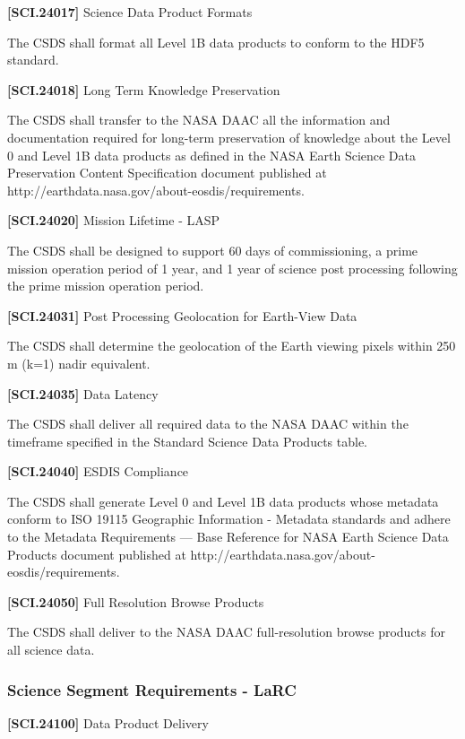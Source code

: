 \documentclass[12pt,oneside,oldfontcommands]{memoir}
\begin{document}
\textbf{[SCI.24017]} Science Data Product Formats

The \gls{CSDS} shall format all Level 1B data products to conform to the HDF5 standard.

\textbf{[SCI.24018]} Long Term Knowledge Preservation

The \gls{CSDS} shall transfer to the NASA \gls{DAAC} all the information and documentation required for long-term preservation of knowledge about the Level 0 and Level 1B data products as defined in the NASA Earth Science Data Preservation Content Specification document published at http:\slash \slash earthdata.nasa.gov\slash about-eosdis\slash requirements.

\textbf{[SCI.24020]} Mission Lifetime - \gls{LASP}

The \gls{CSDS} shall be designed to support 60 days of commissioning, a prime mission operation period of 1 year, and 1 year of science post processing following the prime mission operation period.

\textbf{[SCI.24031]} Post Processing Geolocation for Earth-View Data

The \gls{CSDS} shall determine the geolocation of the Earth viewing pixels within 250 m (k=1) nadir equivalent.

\textbf{[SCI.24035]} Data Latency

The \gls{CSDS} shall deliver all required data to the NASA \gls{DAAC} within the timeframe specified in the Standard Science Data Products table.

\textbf{[SCI.24040]} \gls{ESDIS} Compliance

The \gls{CSDS} shall generate Level 0 and Level 1B data products whose metadata conform to ISO 19115 Geographic Information - Metadata standards and adhere to the Metadata Requirements --- Base Reference for NASA Earth Science Data Products document published at http:\slash \slash earthdata.nasa.gov\slash about-eosdis\slash requirements.

\textbf{[SCI.24050]} Full Resolution Browse Products

The \gls{CSDS} shall deliver to the NASA \gls{DAAC} full-resolution browse products for all science data.

\subsubsection{Science Segment Requirements - LaRC}
\label{sciencesegmentrequirements-larc}

\textbf{[SCI.24100]} Data Product Delivery
\end{document}

